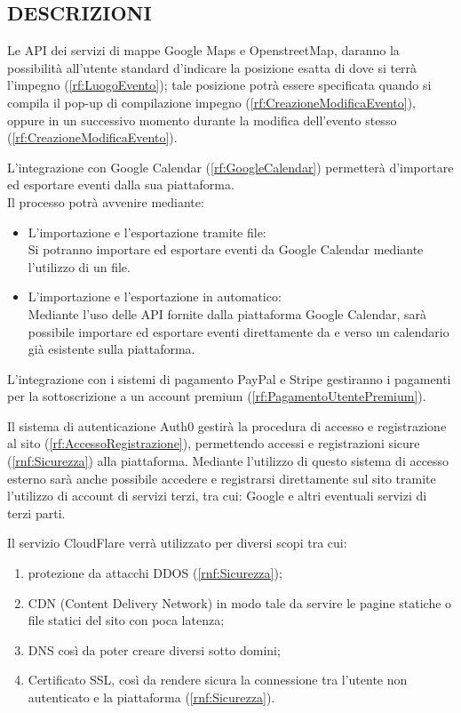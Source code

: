 \subsection*{DESCRIZIONI}
\begin{listaPersonale}[BE]{}
 Le API dei servizi di mappe Google Maps e OpenstreetMap, daranno la possibilità all'utente standard d'indicare la posizione esatta di dove si terrà l'impegno (\ref{rf:LuogoEvento}); tale posizione potrà essere specificata quando si compila il pop-up di compilazione impegno (\ref{rf:CreazioneModificaEvento}), oppure in un successivo momento durante la modifica dell'evento stesso (\ref{rf:CreazioneModificaEvento}).

 L'integrazione con Google Calendar (\ref{rf:GoogleCalendar}) permetterà d'importare ed esportare eventi dalla sua piattaforma.\\
Il processo potrà avvenire mediante:
\begin{itemize}
    \item L'importazione e l'esportazione tramite file: \\
          Si potranno importare ed esportare eventi da Google Calendar mediante l'utilizzo di un file.
    \item L'importazione e l'esportazione in automatico: \\
          Mediante l'uso delle API fornite dalla piattaforma Google Calendar, sarà possibile importare ed esportare eventi direttamente da e verso un calendario già esistente sulla piattaforma.
\end{itemize}

 L'integrazione con i sistemi di pagamento PayPal e Stripe gestiranno i pagamenti per la sottoscrizione a un account premium (\ref{rf:PagamentoUtentePremium}).

 Il sistema di autenticazione Auth0 gestirà la procedura di accesso e registrazione al sito (\ref{rf:AccessoRegistrazione}), permettendo accessi e registrazioni sicure (\ref{rnf:Sicurezza}) alla piattaforma. Mediante l'utilizzo di questo sistema di accesso esterno sarà anche possibile accedere e registrarsi direttamente sul sito tramite l'utilizzo di account di servizi terzi, tra cui: Google e altri eventuali servizi di terzi parti.

 Il servizio CloudFlare verrà utilizzato per diversi scopi tra cui:
\begin{enumerate}
    \item protezione da attacchi DDOS (\ref{rnf:Sicurezza});
    \item CDN (Content Delivery Network) in modo tale da servire le pagine statiche o file statici del sito con poca latenza;
    \item DNS così da poter creare diversi sotto domini;
    \item Certificato SSL, così da rendere sicura la connessione tra l'utente non autenticato e la piattaforma (\ref{rnf:Sicurezza}).
\end{enumerate}


\end{listaPersonale}
